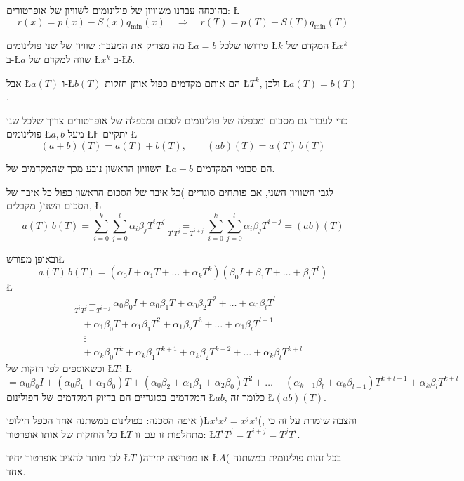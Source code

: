 \documentclass[english,hebrew]{article}
\begin{document}
בהוכחה עברנו משוויון של פולינומים לשוויון של אופרטורים: \L{%
\[
r(x)=p(x)-S(x)q_{\min}(x)\quad\Longrightarrow\quad r(T)=p(T)-S(T)q_{\min}(T)
\]
}%

מה מצדיק את המעבר: שוויון של שני פולינומים \L{$a=b$} פירושו שלכל
\L{$k$} המקדם של \L{$x^{k}$} ב-\L{$a$} שווה למקדם של \L{$x^{k}$}
ב-\L{$b$}.

אבל \L{$a(T)$} ו-\L{$b(T)$} הם אותם מקדמים כפול אותן חזקות \L{$T^{k}$},
ולכן \L{$a(T)=b(T)$}.

כדי לעבור גם מסכום ומכפלה של פולינומים לסכום ומכפלה של אופרטורים צריך
שלכל שני פולינומים \L{$a,b$} מעל \L{$\mathbb{F}$} יתקיים \L{%
\[
(a+b)(T)=a(T)+b(T),\qquad(ab)(T)=a(T)\,b(T)
\]
}%

השוויון הראשון נובע מכך שהמקדמים של \L{$a+b$} הם סכומי המקדמים. 

לגבי השוויון השני, אם פותחים סוגריים )כל איבר של הסכום הראשון כפול
כל איבר של הסכום השני( מקבלים, \L{%
\[
a(T)\,b(T)=\sum_{i=0}^{k}\sum_{j=0}^{l}\alpha_{i}\beta_{j}T^{i}T^{j}\underset{T^{i}T^{j}=T^{i+j}}{=}\sum_{i=0}^{k}\sum_{j=0}^{l}\alpha_{i}\beta_{j}T^{i+j}=(ab)(T)
\]
}%

ובאופן מפורש\L{%
\[
a(T)\,b(T)=\left(\alpha_{0}I+\alpha_{1}T+\dots+\alpha_{k}T^{k}\right)\left(\beta_{0}I+\beta_{1}T+\dots+\beta_{l}T^{l}\right)
\]
}%
\L{%
\begin{align*}
 & \underset{T^{i}T^{j}=T^{i+j}}{=}\alpha_{0}\beta_{0}I+\alpha_{0}\beta_{1}T+\alpha_{0}\beta_{2}T^{2}+\dots+\alpha_{0}\beta_{l}T^{l}\\
 & \quad+\alpha_{1}\beta_{0}T+\alpha_{1}\beta_{1}T^{2}+\alpha_{1}\beta_{2}T^{3}+\dots+\alpha_{1}\beta_{l}T^{l+1}\\
 & \quad\ \vdots\\
 & \quad+\alpha_{k}\beta_{0}T^{k}+\alpha_{k}\beta_{1}T^{k+1}+\alpha_{k}\beta_{2}T^{k+2}+\dots+\alpha_{k}\beta_{l}T^{k+l}
\end{align*}
}%
וכשאוספים לפי חזקות של \L{$T$}: \L{%
\[
=\alpha_{0}\beta_{0}I+\left(\alpha_{0}\beta_{1}+\alpha_{1}\beta_{0}\right)T+\left(\alpha_{0}\beta_{2}+\alpha_{1}\beta_{1}+\alpha_{2}\beta_{0}\right)T^{2}+\dots+\left(\alpha_{k-1}\beta_{l}+\alpha_{k}\beta_{l-1}\right)T^{k+l-1}+\alpha_{k}\beta_{l}T^{k+l}
\]
}%
המקדמים בסוגריים הם בדיוק המקדמים של הפולינום \L{$ab$}, כלומר זה
\L{$(ab)(T)$}.

איפה הסכנה: בפולינום במשתנה אחד הכפל חילופי )\L{$x^{i}x^{j}=x^{j}x^{i}$}(,
והצבה שומרת על זה כי כל החזקות של אותו אופרטור \L{$T$} מתחלפות זו
עם זו: \L{$T^{i}T^{j}=T^{i+j}=T^{j}T^{i}$}.

לכן מותר להציב אופרטור יחיד \L{$T$} )או מטריצה יחידה \L{$A$}( בכל
זהות פולינומית במשתנה אחד.
\end{document}
